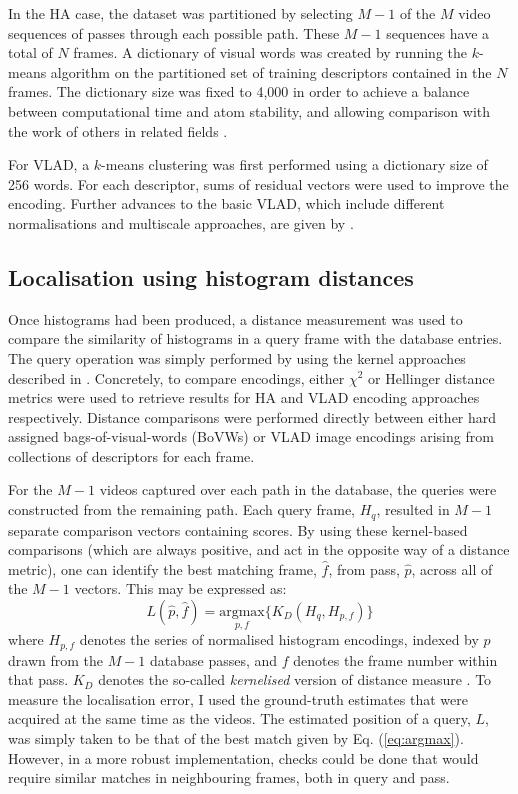 In the HA case, the dataset was partitioned by selecting $M-1$ of the $M$ video sequences of passes through each possible path. These $M-1$ sequences have a total of $N$ frames. A dictionary of visual words was created by running the $k$-means algorithm on the partitioned set of training descriptors contained in the $N$ frames. The dictionary size was fixed to 4,000 in order to achieve a balance between computational time and atom stability, and allowing comparison with the work of others in related fields \cite{Chatfield2011}.

For VLAD, a $k$-means clustering was first performed using a dictionary size of 256 words. For each descriptor, sums of residual vectors were used to improve the encoding.  Further advances to the basic VLAD, which include different normalisations and multiscale approaches, are given by \cite{Arandjelovic}. 

\subsection{Localisation using histogram distances}
\label{sec:kernel_encodings}
Once histograms had been produced, a distance measurement was used to compare the similarity of histograms in a query frame with the database entries.  The query operation was simply performed by using the kernel approaches described in \cite{Vedaldi2010}.  Concretely, to compare encodings, either $\chi^2$ or Hellinger distance metrics \citep{Vedaldi2012} were used to retrieve results for HA and VLAD encoding approaches respectively. Distance comparisons were performed directly between either hard assigned bags-of-visual-words (BoVWs) or VLAD image encodings arising from collections of descriptors for each frame. 

For the $M-1$ videos captured over each path in the database, the queries were constructed from the remaining path.   Each query frame, $H_q$, resulted in $M-1$ separate comparison vectors containing scores.  By using these kernel-based comparisons (which are always positive, and act in the opposite way of a distance metric), one can identify the best matching frame, $\hat{f}$, from pass, $\hat{p}$, across all of the $M-1$ vectors.  This may be expressed as: 
\begin{equation}
L(\hat{p},\hat{f}) = \underset{p,f}{\textrm{argmax}} \lbrace K_{D}(H_q,H_{p,f})\rbrace
\label{eq:argmax}
\end{equation}
where $H_{p,f}$ denotes the series of normalised histogram encodings, indexed by $p$ drawn from the $M-1$ database passes, and $f$ denotes the frame number within that pass. $K_D$ denotes the so-called \textit{kernelised} version of distance measure \cite{Vedaldi2010}.  To measure the localisation error, I used the ground-truth estimates that were acquired at the same time as the videos. The estimated position of a query, $L$, was simply taken to be that of the best match given by Eq. (\ref{eq:argmax}).  However, in a more robust implementation, checks could be done that would require similar matches in neighbouring frames, both in query and pass.



